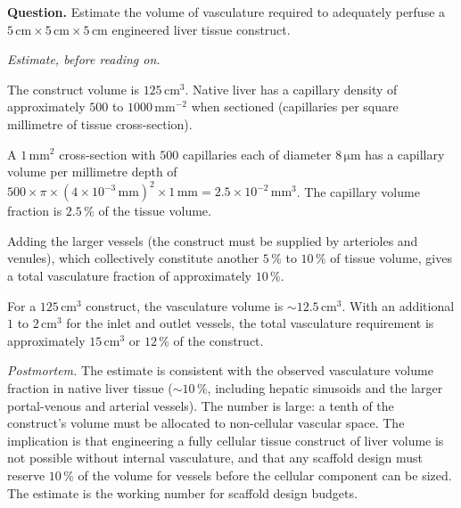 \begin{estimation}
\textbf{Question.} Estimate the volume of vasculature required to
adequately perfuse a $5\,\text{cm} \times 5\,\text{cm} \times 5\,\text{cm}$
engineered liver tissue construct.

\smallskip
\textit{Estimate, before reading on.}

\smallskip
The construct volume is $125\,\text{cm}^3$. Native liver has a
capillary density of approximately $500$ to $1000\,\text{mm}^{-2}$
when sectioned (capillaries per square millimetre of tissue
cross-section).

A $1\,\text{mm}^2$ cross-section with $500$ capillaries each of
diameter $8\,\si{\micro\meter}$ has a capillary volume per
millimetre depth of $500 \times \pi \times (4 \times 10^{-3}\,\text{mm})^2
\times 1\,\text{mm} = 2.5 \times 10^{-2}\,\text{mm}^3$. The
capillary volume fraction is $2.5\,\%$ of the tissue volume.

Adding the larger vessels (the construct must be supplied by
arterioles and venules), which collectively constitute another
$5\,\%$ to $10\,\%$ of tissue volume, gives a total vasculature
fraction of approximately $10\,\%$.

For a $125\,\text{cm}^3$ construct, the vasculature volume is
$\sim 12.5\,\text{cm}^3$. With an additional $1$ to $2\,\text{cm}^3$
for the inlet and outlet vessels, the total vasculature requirement
is approximately $15\,\text{cm}^3$ or $12\,\%$ of the construct.

\smallskip
\textit{Postmortem.} The estimate is consistent with the observed
vasculature volume fraction in native liver tissue ($\sim 10\,\%$,
including hepatic sinusoids and the larger portal-venous and arterial
vessels). The number is large: a tenth of the construct's volume must
be allocated to non-cellular vascular space. The implication is that
engineering a fully cellular tissue construct of liver volume is not
possible without internal vasculature, and that any scaffold design
must reserve $10\,\%$ of the volume for vessels before the cellular
component can be sized. The estimate is the working number for
scaffold design budgets.
\end{estimation}

